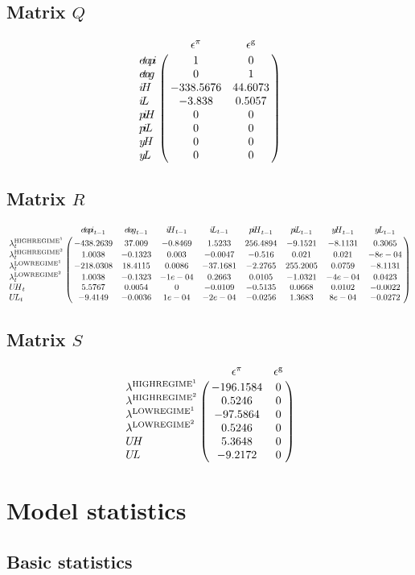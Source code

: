 \subsection*{Matrix $Q$}

$$\bordermatrix{
~ & \epsilon^{\pi} & \epsilon^{\mathrm{g}} \cr
{e\!t\!a\!p\!i} & 1 & 0 \cr
{e\!t\!a\!g} & 0 & 1 \cr
{i\!H} & -338.5676 & 44.6073 \cr
{i\!L} & -3.838 & 0.5057 \cr
{p\!i\!H} & 0 & 0 \cr
{p\!i\!L} & 0 & 0 \cr
{y\!H} & 0 & 0 \cr
{y\!L} & 0 & 0 \cr
}$$

\subsection*{Matrix $R$}

$$\bordermatrix{
~ & {e\!t\!a\!p\!i}_{t-1} & {e\!t\!a\!g}_{t-1} & {i\!H}_{t-1} & {i\!L}_{t-1} & {p\!i\!H}_{t-1} & {p\!i\!L}_{t-1} & {y\!H}_{t-1} & {y\!L}_{t-1} \cr
\lambda^{\mathrm{HIGHREGIME}^{\mathrm{1}}}_{t} & -438.2639 & 37.009 & -0.8469 & 1.5233 & 256.4894 & -9.1521 & -8.1131 & 0.3065 \cr
\lambda^{\mathrm{HIGHREGIME}^{\mathrm{2}}}_{t} & 1.0038 & -0.1323 & 0.003 & -0.0047 & -0.516 & 0.021 & 0.021 & -8e-04 \cr
\lambda^{\mathrm{LOWREGIME}^{\mathrm{1}}}_{t} & -218.0308 & 18.4115 & 0.0086 & -37.1681 & -2.2765 & 255.2005 & 0.0759 & -8.1131 \cr
\lambda^{\mathrm{LOWREGIME}^{\mathrm{2}}}_{t} & 1.0038 & -0.1323 & -1e-04 & 0.2663 & 0.0105 & -1.0321 & -4e-04 & 0.0423 \cr
{U\!H}_{t} & 5.5767 & 0.0054 & 0 & -0.0109 & -0.5135 & 0.0668 & 0.0102 & -0.0022 \cr
{U\!L}_{t} & -9.4149 & -0.0036 & 1e-04 & -2e-04 & -0.0256 & 1.3683 & 8e-04 & -0.0272 \cr
}$$

\subsection*{Matrix $S$}

$$\bordermatrix{
~ & \epsilon^{\pi} & \epsilon^{\mathrm{g}} \cr
\lambda^{\mathrm{HIGHREGIME}^{\mathrm{1}}} & -196.1584 & 0 \cr
\lambda^{\mathrm{HIGHREGIME}^{\mathrm{2}}} & 0.5246 & 0 \cr
\lambda^{\mathrm{LOWREGIME}^{\mathrm{1}}} & -97.5864 & 0 \cr
\lambda^{\mathrm{LOWREGIME}^{\mathrm{2}}} & 0.5246 & 0 \cr
{U\!H} & 5.3648 & 0 \cr
{U\!L} & -9.2172 & 0 \cr
}$$


\section{Model statistics}

\subsection{Basic statistics}

